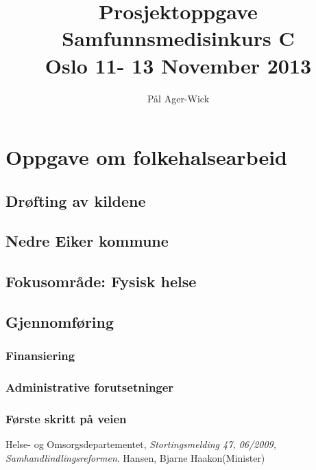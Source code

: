 \documentclass[11pt]{memoir} %
\title{Prosjektoppgave \\ Samfunnsmedisinkurs C \\ Oslo 11- 13 November 2013}
\author{Pål Ager-Wick}
\date{} %
\begin{document}
			\renewcommand{\chaptername}{Del}
            \renewcommand{\contentsname}{Innhold}
            \renewcommand\listfigurename{Illustrasjoner}
            \renewcommand\tablename{Tabell}
			\renewcommand\listtablename{Tabeller}
            \renewcommand{\figurename}{Illustrasjon}



\chapter{Oppgave om folkehalsearbeid}
\section{Drøfting av kildene}
\section{Nedre Eiker kommune}
\section{Fokusområde: Fysisk helse}
\section{Gjennomføring}
\subsection{Finansiering}
\subsection{Administrative forutsetninger}
\subsection{Første skritt på veien}

 \renewcommand{\bibname}{Kilder:}
              \begin{thebibliography}{99}

                  Helse- og Omsorgsdepartementet,
                  \emph{Stortingsmelding 47, 06/2009, Samhandlindlingsreformen}.
                  Hansen, Bjarne Haakon(Minister)

\end{thebibliography}
\end{document}
